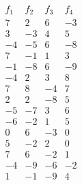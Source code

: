 $$\begin{array}{rrrr} 
f_1 & f_2 & f_3 & f_4 \\ 
\hline 
 7 &  2 &  6 & -3 \\ 
 3 & -3 &  4 &  5 \\ 
-4 & -5 &  6 & -8 \\ 
 7 & -1 &  1 &  3 \\ 
-1 & -8 &  6 & -9 \\ 
-4 &  2 &  3 &  8 \\ 
 7 &  8 & -4 &  7 \\ 
 2 &  2 & -8 &  5 \\ 
-5 & -7 &  3 &  6 \\ 
-6 & -2 &  1 &  5 \\ 
 0 &  6 & -3 &  0 \\ 
 5 & -2 &  2 &  0 \\ 
 7 &  6 & -2 &  1 \\ 
-4 & -9 & -6 & -2 \\ 
 1 & -1 & -9 &  4 \\ 
\end{array}$$ 
